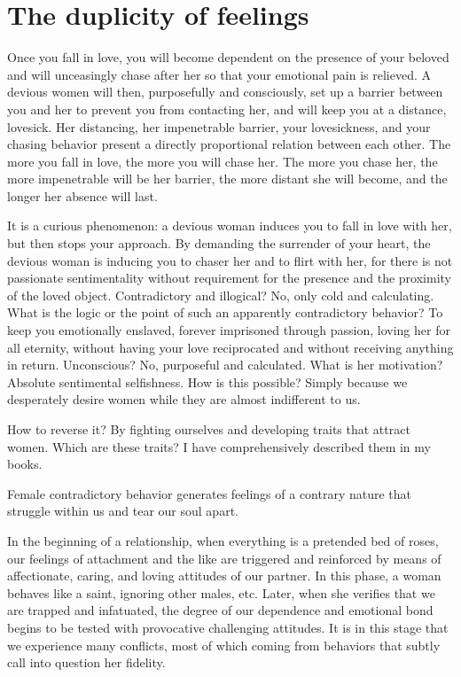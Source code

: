 \section{The duplicity of feelings}

\par Once you fall in love, you will become dependent on the presence of your beloved and will unceasingly chase after her so that your emotional pain is relieved. A devious women will then, purposefully and consciously, set up a barrier between you and her to prevent you from contacting her, and will keep you at a distance, lovesick. Her distancing, her impenetrable barrier, your lovesickness, and your chasing behavior present a directly proportional relation between each other. The more you fall in love, the more you will chase her. The more you chase her, the more impenetrable will be her barrier, the more distant she will become, and the longer her absence will last.

\par It is a curious phenomenon: a devious woman induces you to fall in love with her, but then stops your approach. By demanding the surrender of your heart, the devious woman is inducing you to chaser her and to flirt with her, for there is not passionate sentimentality without requirement for the presence and the proximity of the loved object. Contradictory and illogical? No, only cold and calculating. What is the logic or the point of such an apparently contradictory behavior? To keep you emotionally enslaved, forever imprisoned through passion, loving her for all eternity, without having your love reciprocated and without receiving anything in return. Unconscious? No, purposeful and calculated. What is her motivation? Absolute sentimental selfishness. How is this possible? Simply because we desperately desire women while they are almost indifferent to us.

\par How to reverse it? By fighting ourselves and developing traits that attract women. Which are these traits? I have comprehensively described them in my books.

\par Female contradictory behavior generates feelings of a contrary nature that struggle within us and tear our soul apart.

\par In the beginning of a relationship, when everything is a pretended bed of roses, our feelings of attachment and the like are triggered and reinforced by means of affectionate, caring, and loving attitudes of our partner. In this phase, a woman behaves like a saint, ignoring other males, etc. Later, when she verifies that we are trapped and infatuated, the degree of our dependence and emotional bond begins to be tested with provocative challenging attitudes. It is in this stage that we experience many conflicts, most of which coming from behaviors that subtly call into question her fidelity.

